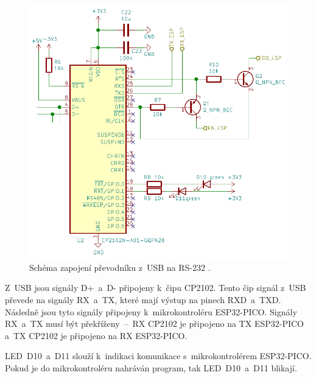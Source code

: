   \begin{figure}[!h]
      \begin{center}
        \includegraphics[scale=0.6]{obrazky/CP2102_schema.png}
      \end{center}
      \caption[Schéma zapojení převodníku z~USB na RS-232 \cite{Devkit_schema}]{Schéma zapojení převodníku z~USB na RS-232 \cite{Devkit_schema}.}
  \end{figure}

  Z~USB jsou signály D+~a~D- připojeny k~čipu CP2102. Tento čip signál z~USB převede na signály RX~a~TX, které mají výstup 
  na pinech RXD~a~TXD. Následně jsou tyto signály připojeny k~mikrokontroléru ESP32-PICO. Signály RX~a~TX musí být překříženy~–~RX 
  CP2102 je připojeno na TX ESP32-PICO a~TX CP2102 je připojeno na RX ESP32-PICO. 

  LED~D10~a~D11 slouží k~indikaci komunikace s~mikrokontrolérem ESP32-PICO. Pokud je do mikrokontroléru nahráván program, tak LED~D10~a~D11 
  blikají.

